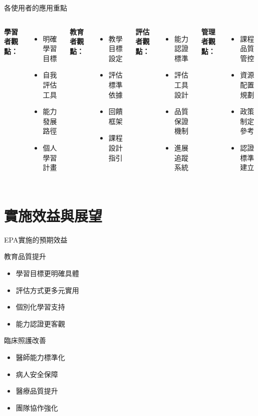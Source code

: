\documentclass[aspectratio=169]{beamer}
\begin{document}
\begin{frame}{各使用者的應用重點}
\begin{columns}[c]
\textbf{學習者觀點：}
\begin{itemize}
\item 明確學習目標
\item 自我評估工具
\item 能力發展路徑
\item 個人學習計畫
\end{itemize}

\textbf{教育者觀點：}
\begin{itemize}
\item 教學目標設定
\item 評估標準依據
\item 回饋框架
\item 課程設計指引
\end{itemize}

\textbf{評估者觀點：}
\begin{itemize}
\item 能力認證標準
\item 評估工具設計
\item 品質保證機制
\item 進展追蹤系統
\end{itemize}

\textbf{管理者觀點：}
\begin{itemize}
\item 課程品質管控
\item 資源配置規劃
\item 政策制定參考
\item 認證標準建立
\end{itemize}
\end{columns}
\end{frame}

\section{實施效益與展望}

\begin{frame}{EPA實施的預期效益}
\begin{block}{教育品質提升}
\begin{itemize}
\item 學習目標更明確具體
\item 評估方式更多元實用
\item 個別化學習支持
\item 能力認證更客觀
\end{itemize}
\end{block}

\begin{block}{臨床照護改善}
\begin{itemize}
\item 醫師能力標準化
\item 病人安全保障
\item 醫療品質提升
\item 團隊協作強化
\end{itemize}
\end{block}
\end{frame}
\end{document}
